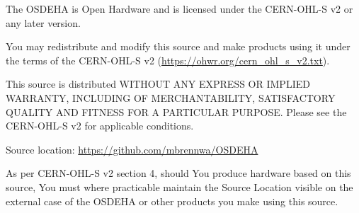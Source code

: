The OSDEHA is Open Hardware and is licensed under the CERN-OHL-S v2 or any later version.

You may redistribute and modify this source and make products using it under the terms of the CERN-OHL-S v2 (\url{https://ohwr.org/cern_ohl_s_v2.txt}).

This source is distributed WITHOUT ANY EXPRESS OR IMPLIED WARRANTY, INCLUDING OF MERCHANTABILITY, SATISFACTORY QUALITY AND FITNESS FOR A PARTICULAR PURPOSE. Please see the CERN-OHL-S v2 for applicable conditions.

Source location: \url{https://github.com/mbrennwa/OSDEHA}

As per CERN-OHL-S v2 section 4, should You produce hardware based on this source, You must where practicable maintain the Source Location visible on the external case of the OSDEHA or other products you make using this source.            


\clearpage





